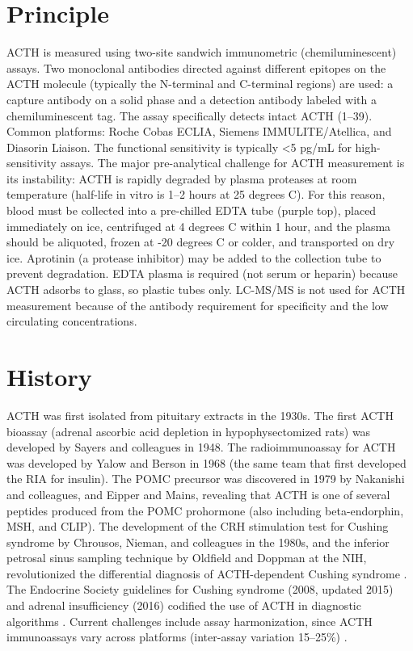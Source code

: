 \section*{Principle}
ACTH is measured using two-site sandwich immunometric (chemiluminescent) assays. Two monoclonal antibodies directed against different epitopes on the ACTH molecule (typically the N-terminal and C-terminal regions) are used: a capture antibody on a solid phase and a detection antibody labeled with a chemiluminescent tag. The assay specifically detects intact ACTH (1--39). Common platforms: Roche Cobas ECLIA, Siemens IMMULITE/Atellica, and Diasorin Liaison. The functional sensitivity is typically <5 pg/mL for high-sensitivity assays. The major pre-analytical challenge for ACTH measurement is its instability: ACTH is rapidly degraded by plasma proteases at room temperature (half-life in vitro is 1--2 hours at 25 degrees C). For this reason, blood must be collected into a pre-chilled EDTA tube (purple top), placed immediately on ice, centrifuged at 4 degrees C within 1 hour, and the plasma should be aliquoted, frozen at -20 degrees C or colder, and transported on dry ice. Aprotinin (a protease inhibitor) may be added to the collection tube to prevent degradation. EDTA plasma is required (not serum or heparin) because ACTH adsorbs to glass, so plastic tubes only. LC-MS/MS is not used for ACTH measurement because of the antibody requirement for specificity and the low circulating concentrations.

\section*{History}
ACTH was first isolated from pituitary extracts in the 1930s. The first ACTH bioassay (adrenal ascorbic acid depletion in hypophysectomized rats) was developed by Sayers and colleagues in 1948. The radioimmunoassay for ACTH was developed by Yalow and Berson in 1968 (the same team that first developed the RIA for insulin). The POMC precursor was discovered in 1979 by Nakanishi and colleagues, and Eipper and Mains, revealing that ACTH is one of several peptides produced from the POMC prohormone (also including beta-endorphin, MSH, and CLIP). The development of the CRH stimulation test for Cushing syndrome by Chrousos, Nieman, and colleagues in the 1980s, and the inferior petrosal sinus sampling technique by Oldfield and Doppman at the NIH, revolutionized the differential diagnosis of ACTH-dependent Cushing syndrome \cite{oldfield1991petrosal}. The Endocrine Society guidelines for Cushing syndrome (2008, updated 2015) and adrenal insufficiency (2016) codified the use of ACTH in diagnostic algorithms \cite{nieman2015treatment, bornstein2016diagnosis}. Current challenges include assay harmonization, since ACTH immunoassays vary across platforms (inter-assay variation 15--25\%) \cite{findling2017diagnosis}.


